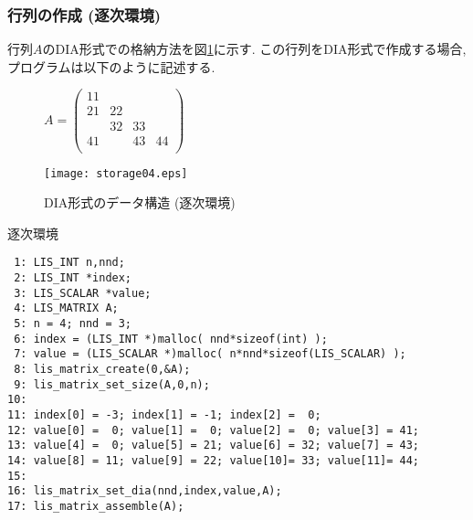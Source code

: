 \documentclass[a4paper]{jarticle}
\begin{document}
{{\subsubsection{行列の作成 (逐次環境)}
行列$A$のDIA形式での格納方法を図\ref{fig:storage04}に示す. 
この行列をDIA形式で作成する場合, プログラムは以下のように記述する. 
\begin{figure}[h]
{\centering 
\begin{minipage}{0.3\textwidth}
\begin{flushright}
$ 
A = \left(
\begin{array}{cccc}
11 &    &    &    \\
21 & 22 &    &    \\
   & 32 & 33 &    \\
41 &    & 43 & 44 \\
\end{array}\right)
$
\end{flushright}
\end{minipage}
\begin{minipage}{0.6\textwidth}
\begin{flushleft}
\texttt{[image: storage04.eps]} 
\end{flushleft}
\end{minipage}
\caption{DIA形式のデータ構造 (逐次環境)}\label{fig:storage04}}
\end{figure}
\begin{itembox}[l]{逐次環境}
\small
\begin{verbatim}
 1: LIS_INT n,nnd;
 2: LIS_INT *index;
 3: LIS_SCALAR *value;
 4: LIS_MATRIX A;
 5: n = 4; nnd = 3;
 6: index = (LIS_INT *)malloc( nnd*sizeof(int) );
 7: value = (LIS_SCALAR *)malloc( n*nnd*sizeof(LIS_SCALAR) );
 8: lis_matrix_create(0,&A);
 9: lis_matrix_set_size(A,0,n);
10:
11: index[0] = -3; index[1] = -1; index[2] =  0;
12: value[0] =  0; value[1] =  0; value[2] =  0; value[3] = 41;
13: value[4] =  0; value[5] = 21; value[6] = 32; value[7] = 43;
14: value[8] = 11; value[9] = 22; value[10]= 33; value[11]= 44;
15:
16: lis_matrix_set_dia(nnd,index,value,A);
17: lis_matrix_assemble(A);
\end{verbatim}
\end{itembox}

}}
\end{document}
